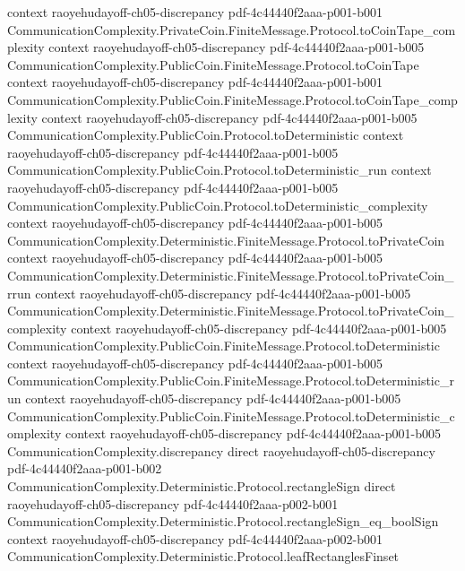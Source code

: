 \begin{lemma}
  {context}
  {raoyehudayoff-ch05-discrepancy}
  {pdf-4c44440f2aaa-p001-b001}
\proofstep
  {CommunicationComplexity.PrivateCoin.FiniteMessage.Protocol.toCoinTape_complexity}
  {context}
  {raoyehudayoff-ch05-discrepancy}
  {pdf-4c44440f2aaa-p001-b005}
\proofstep
  {CommunicationComplexity.PublicCoin.FiniteMessage.Protocol.toCoinTape}
  {context}
  {raoyehudayoff-ch05-discrepancy}
  {pdf-4c44440f2aaa-p001-b001}
\proofstep
  {CommunicationComplexity.PublicCoin.FiniteMessage.Protocol.toCoinTape_complexity}
  {context}
  {raoyehudayoff-ch05-discrepancy}
  {pdf-4c44440f2aaa-p001-b005}
\proofstep
  {CommunicationComplexity.PublicCoin.Protocol.toDeterministic}
  {context}
  {raoyehudayoff-ch05-discrepancy}
  {pdf-4c44440f2aaa-p001-b005}
\proofstep
  {CommunicationComplexity.PublicCoin.Protocol.toDeterministic_run}
  {context}
  {raoyehudayoff-ch05-discrepancy}
  {pdf-4c44440f2aaa-p001-b005}
\proofstep
  {CommunicationComplexity.PublicCoin.Protocol.toDeterministic_complexity}
  {context}
  {raoyehudayoff-ch05-discrepancy}
  {pdf-4c44440f2aaa-p001-b005}
\proofstep
  {CommunicationComplexity.Deterministic.FiniteMessage.Protocol.toPrivateCoin}
  {context}
  {raoyehudayoff-ch05-discrepancy}
  {pdf-4c44440f2aaa-p001-b005}
\proofstep
  {CommunicationComplexity.Deterministic.FiniteMessage.Protocol.toPrivateCoin_rrun}
  {context}
  {raoyehudayoff-ch05-discrepancy}
  {pdf-4c44440f2aaa-p001-b005}
\proofstep
  {CommunicationComplexity.Deterministic.FiniteMessage.Protocol.toPrivateCoin_complexity}
  {context}
  {raoyehudayoff-ch05-discrepancy}
  {pdf-4c44440f2aaa-p001-b005}
\proofstep
  {CommunicationComplexity.PublicCoin.FiniteMessage.Protocol.toDeterministic}
  {context}
  {raoyehudayoff-ch05-discrepancy}
  {pdf-4c44440f2aaa-p001-b005}
\proofstep
  {CommunicationComplexity.PublicCoin.FiniteMessage.Protocol.toDeterministic_run}
  {context}
  {raoyehudayoff-ch05-discrepancy}
  {pdf-4c44440f2aaa-p001-b005}
\proofstep
  {CommunicationComplexity.PublicCoin.FiniteMessage.Protocol.toDeterministic_complexity}
  {context}
  {raoyehudayoff-ch05-discrepancy}
  {pdf-4c44440f2aaa-p001-b005}
\proofstep
  {CommunicationComplexity.discrepancy}
  {direct}
  {raoyehudayoff-ch05-discrepancy}
  {pdf-4c44440f2aaa-p001-b002}
\proofstep
  {CommunicationComplexity.Deterministic.Protocol.rectangleSign}
  {direct}
  {raoyehudayoff-ch05-discrepancy}
  {pdf-4c44440f2aaa-p002-b001}
\proofstep
  {CommunicationComplexity.Deterministic.Protocol.rectangleSign_eq_boolSign}
  {context}
  {raoyehudayoff-ch05-discrepancy}
  {pdf-4c44440f2aaa-p002-b001}
\proofstep
  {CommunicationComplexity.Deterministic.Protocol.leafRectanglesFinset}

\end{lemma}
